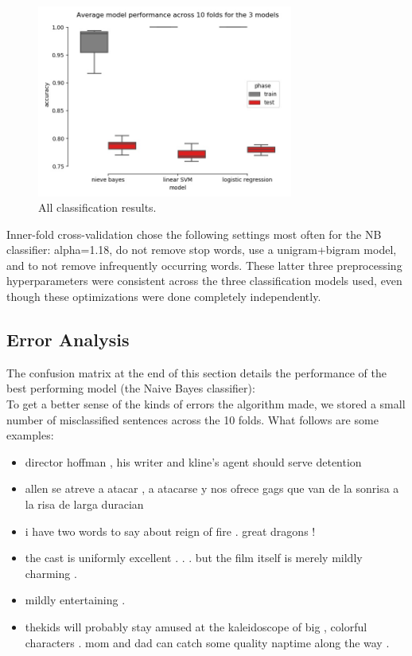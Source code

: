 \documentclass{amsart}
\theoremstyle{definition}
\theoremstyle{remark}
\numberwithin{equation}{section}
\begin{document}
\begin{figure}
  \caption{All classification results.}
  \centering
    \includegraphics[width=0.75\textwidth]{accs}
\end{figure}

Inner-fold cross-validation chose the following settings most often for the NB
classifier:  alpha=1.18, do not remove stop words, use a unigram+bigram model,
and to not remove infrequently occurring words. These latter three preprocessing
hyperparameters were consistent across the three classification models used,
even though these optimizations were done completely independently.

\subsection{Error Analysis}

The confusion matrix at the end of this section details the performance of the
best performing model (the Naive Bayes classifier): \\

To get a better sense of the kinds of errors the algorithm made, we stored a small
number of misclassified sentences across the 10 folds. What follows are some examples: \\

\begin{itemize}
    \item{director hoffman , his writer and kline's agent should serve detention}
    \item{allen se atreve a atacar , a atacarse y nos ofrece gags que van de la sonrisa a la risa de larga duracian}
    \item{i have two words to say about reign of fire . great dragons ! }
    \item{the cast is uniformly excellent . . . but the film itself is merely mildly charming .}
    \item{mildly entertaining .}
    \item{thekids will probably stay amused at the kaleidoscope of big , colorful characters . mom and dad can catch some quality naptime along the way .}
\end{itemize}
\end{document}
